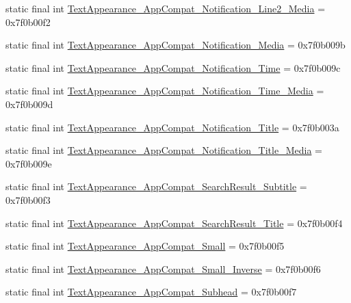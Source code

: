 \begin{CompactItemize}
\item 
static final int \hyperlink{classandroid_1_1support_1_1v7_1_1mediarouter_1_1_r_1_1style_4ee37dce425b9e22c86730c982a7e6ba}{TextAppearance\_\-AppCompat\_\-Notification\_\-Line2\_\-Media} = 0x7f0b00f2
\item 
static final int \hyperlink{classandroid_1_1support_1_1v7_1_1mediarouter_1_1_r_1_1style_e25301cebfa4f1b7c010cb70265a1004}{TextAppearance\_\-AppCompat\_\-Notification\_\-Media} = 0x7f0b009b
\item 
static final int \hyperlink{classandroid_1_1support_1_1v7_1_1mediarouter_1_1_r_1_1style_87ac0755cb351385cff5c8857641c199}{TextAppearance\_\-AppCompat\_\-Notification\_\-Time} = 0x7f0b009c
\item 
static final int \hyperlink{classandroid_1_1support_1_1v7_1_1mediarouter_1_1_r_1_1style_8c0c59374bb8bf5407254604e6511228}{TextAppearance\_\-AppCompat\_\-Notification\_\-Time\_\-Media} = 0x7f0b009d
\item 
static final int \hyperlink{classandroid_1_1support_1_1v7_1_1mediarouter_1_1_r_1_1style_4ab11de92a289ff1fd6eee3e33c4ffbc}{TextAppearance\_\-AppCompat\_\-Notification\_\-Title} = 0x7f0b003a
\item 
static final int \hyperlink{classandroid_1_1support_1_1v7_1_1mediarouter_1_1_r_1_1style_845af449b937c09142a2956adb7991e3}{TextAppearance\_\-AppCompat\_\-Notification\_\-Title\_\-Media} = 0x7f0b009e
\item 
static final int \hyperlink{classandroid_1_1support_1_1v7_1_1mediarouter_1_1_r_1_1style_85e220792a71407364d774268258851f}{TextAppearance\_\-AppCompat\_\-SearchResult\_\-Subtitle} = 0x7f0b00f3
\item 
static final int \hyperlink{classandroid_1_1support_1_1v7_1_1mediarouter_1_1_r_1_1style_bd64e539da752ddc376eeddd1fbbcd6d}{TextAppearance\_\-AppCompat\_\-SearchResult\_\-Title} = 0x7f0b00f4
\item 
static final int \hyperlink{classandroid_1_1support_1_1v7_1_1mediarouter_1_1_r_1_1style_003325b7d5728d84cd7f2978b64375dd}{TextAppearance\_\-AppCompat\_\-Small} = 0x7f0b00f5
\item 
static final int \hyperlink{classandroid_1_1support_1_1v7_1_1mediarouter_1_1_r_1_1style_264e4a63bc92709dca68129dbdc24cb3}{TextAppearance\_\-AppCompat\_\-Small\_\-Inverse} = 0x7f0b00f6
\item 
static final int \hyperlink{classandroid_1_1support_1_1v7_1_1mediarouter_1_1_r_1_1style_19934e30d646c522174cffe7547295a7}{TextAppearance\_\-AppCompat\_\-Subhead} = 0x7f0b00f7
\item 

\end{CompactItemize}
